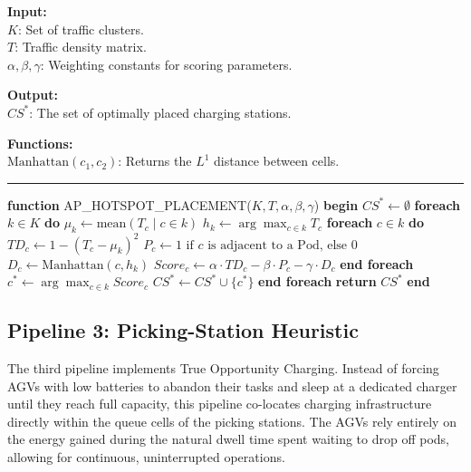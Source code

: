 \documentclass[conference]{IEEEtran}
\newcommand{\alginput}[1]{\vspace{0.2cm}\noindent\textbf{Input:}\\ \indent #1}
\newcommand{\algoutput}[1]{\vspace{0.2cm}\noindent\textbf{Output:}\\ \indent #1}
\newcommand{\algfunc}[1]{\vspace{0.2cm}\noindent\textbf{Functions:}\\ \indent #1}
\begin{document}
\begin{algorithm}[htbp]
\caption{AP\_HOTSPOT\_PLACEMENT: Scoring and Selection}
\label{alg:ap_placement}
\alginput{
$K$: Set of traffic clusters.\\
$T$: Traffic density matrix.\\
$\alpha, \beta, \gamma$: Weighting constants for scoring parameters.
}
\algoutput{
$CS^*$: The set of optimally placed charging stations.
}
\algfunc{
$\text{Manhattan}(c_1, c_2)$: Returns the $L^1$ distance between cells.
}
\vspace{0.2cm}
\hrule
\vspace{0.2cm}
\begin{algorithmic}[1]
\STATE \textbf{function} AP\_HOTSPOT\_PLACEMENT($K, T, \alpha, \beta, \gamma$)
\STATE \textbf{begin}
\STATE \quad $CS^* \leftarrow \emptyset$
\STATE \quad \textbf{foreach} $k \in K$ \textbf{do}
\STATE \quad \quad $\mu_k \leftarrow \text{mean}(T_c \mid c \in k)$
\STATE \quad \quad $h_k \leftarrow \arg\max_{c \in k} T_c$
\STATE \quad \quad \textbf{foreach} $c \in k$ \textbf{do}
\STATE \quad \quad \quad $TD_c \leftarrow 1 - (T_c - \mu_k)^2$
\STATE \quad \quad \quad $P_c \leftarrow 1 \text{ if } c \text{ is adjacent to a Pod, else } 0$
\STATE \quad \quad \quad $D_c \leftarrow \text{Manhattan}(c, h_k)$
\STATE \quad \quad \quad $Score_c \leftarrow \alpha \cdot TD_c - \beta \cdot P_c - \gamma \cdot D_c$
\STATE \quad \quad \textbf{end foreach}
\STATE \quad \quad $c^* \leftarrow \arg\max_{c \in k} Score_c$
\STATE \quad \quad $CS^* \leftarrow CS^* \cup \{c^*\}$
\STATE \quad \textbf{end foreach}
\STATE \quad \textbf{return} $CS^*$
\STATE \textbf{end}
\end{algorithmic}
\end{algorithm}

\subsection{Pipeline 3: Picking-Station Heuristic}
The third pipeline implements True Opportunity Charging. Instead of forcing AGVs with low batteries to abandon their tasks and sleep at a dedicated charger until they reach full capacity, this pipeline co-locates charging infrastructure directly within the queue cells of the picking stations. The AGVs rely entirely on the energy gained during the natural dwell time spent waiting to drop off pods, allowing for continuous, uninterrupted operations.
\end{document}
